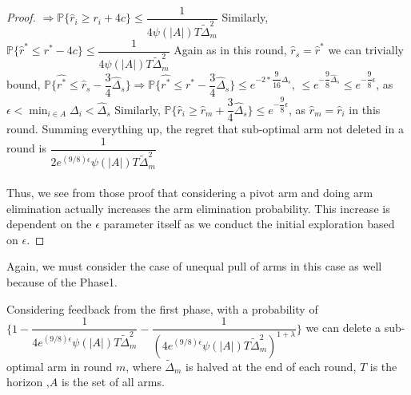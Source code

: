 \begin{proof}
\newline\hspace*{8em} $\Rightarrow \mathbb{P} \lbrace  \hat{r}_{i} \geq r_{i} + 4c \rbrace \leq \dfrac{1}{4\psi(|A|)T\tilde{\Delta}_{m}^{2}}$
\newline Similarly, $ \mathbb{P} \lbrace \hat{r}^{*} \leq r^{*} - 4c \rbrace \leq \dfrac{1}{4\psi(|A|)T\tilde{\Delta}_{m}^{2}}$
\newline
Again as in this round, $\hat{r}_{s} = \hat{r}^{*}$ we can trivially bound, 
\newline$\mathbb{P}\lbrace \hat{r^{*}} \leq \hat{r}_{s} - \dfrac{3}{4}\hat{\Delta}_{s} \rbrace\Rightarrow\mathbb{P}\lbrace \hat{r^{*}} \leq r^{*} - \dfrac{3}{4}\hat{\Delta}_{s} \rbrace \leq e^{-2*\dfrac{9}{16}\hat{\Delta}_{s}}$, 
\newline
\hspace*{11em}$\leq e^{-\dfrac{9}{8}\hat{\Delta}_{s}} \leq e^{-\dfrac{9}{8}\epsilon}$, as $\epsilon < \min_{i\in A}{\Delta_{i}} < \hat{\Delta}_{s}$
\newline
Similarly, $\mathbb{P}\lbrace \hat{r}_{i} \geq \hat{r}_{m} + \dfrac{3}{4}\hat{\Delta}_{s}\rbrace \leq e^{-\dfrac{9}{8}\epsilon}$, as $\hat{r}_{m}= \hat{r}_{i}$ in this round.
\newline
Summing everything up,
the regret that sub-optimal arm not deleted in a round is $\dfrac{1}{2e^{(9/8)\epsilon}\psi(|A|)T\tilde{\Delta}_{m}^{2}}$
\newline
\paragraph*{}Thus, we see from those proof that considering a pivot arm and doing arm elimination actually increases the arm elimination probability. This increase is dependent on the $\epsilon$ parameter itself as we conduct the initial exploration based on $\epsilon$.
\end{proof}

Again, we must consider the case of unequal pull of arms in this case as well because of the Phase1. 

\begin{theorem}
Considering feedback from the first phase, with a probability of  $\bigg\lbrace1-\dfrac{1}{4 e^{(9/8)\epsilon} \psi(|A|)T\tilde{\Delta}_{m}^{2}} - \dfrac{1}{(4 e^{(9/8)\epsilon} \psi(|A|)T\tilde{\Delta}_{m}^{2})^{1+\lambda}}\bigg\rbrace$ we can delete a sub-optimal arm in round $m$, where $\tilde{\Delta}_{m}$ is halved at the end of each round, $T$ is the horizon ,$A$ is the set of all arms.
\end{theorem}

